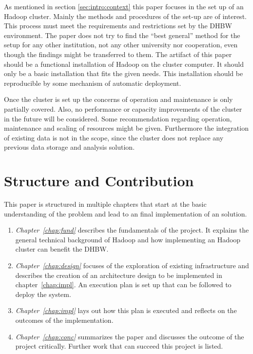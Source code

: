 As mentioned in section \ref{sec:intro:context} this paper focuses in the set up of an Hadoop cluster.
Mainly the methods and procedures of the set-up
are of interest.
This process must meet the requirements and restrictions set by the \ac{DHBW} environment. 
The paper does not try to find the \enquote{best general} method for the setup for any other institution, not any other university nor cooperation, even though the findings might be transferred to them.
The artifact of this paper should be a functional installation of Hadoop on the cluster computer.
It should only be a basic installation that fits the given needs. 
This installation should be reproducible by some mechanism of automatic deployment.

Once the cluster is set up the concerns of operation and maintenance is only partially covered.
Also, no performance or capacity improvements of the cluster in the future will be considered.
Some recommendation regarding operation, maintenance and scaling of resources might be given.
Furthermore the integration of existing data is not 
in the scope, since the cluster does not replace any previous data storage and analysis solution.


\section{Structure and Contribution}
\label{sec:intro:structure}

This paper is structured in multiple chapters that start at the basic understanding of the problem 
and lead to an final implementation of an solution.

\begin{enumerate}
    \item \emph{Chapter~\ref{chap:fund}} describes the fundamentals of the project. 
        It explains the general technical background of Hadoop 
        and how implementing an Hadoop cluster can benefit the \ac{DHBW}. 
    \item \emph{Chapter~\ref{chap:design}} focuses of the exploration of existing
        infrastructure and describes the creation of an architecture design 
        to be implemented in chapter~\ref{chap:impl}. 
        An execution plan is set up that can be followed to deploy the system.
    \item \emph{Chapter~\ref{chap:impl}} lays out how this plan is executed 
        and reflects on the outcomes of the implementation. 
    \item \emph{Chapter~\ref{chap:conc}} summarizes the paper 
        and discusses the outcome of the project critically.
        Further work that can succeed this project is listed.
\end{enumerate}

